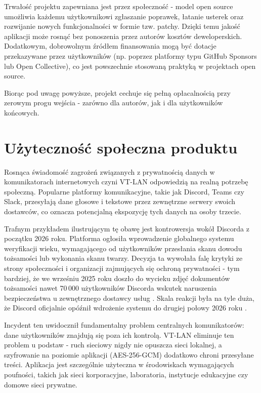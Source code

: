 Trwałość projektu zapewniana jest przez społeczność - model open source
umożliwia każdemu użytkownikowi zgłaszanie poprawek, łatanie usterek oraz
rozwijanie nowych funkcjonalności w formie tzw. patchy. Dzięki temu jakość
aplikacji może rosnąć bez ponoszenia przez autorów kosztów deweloperskich.
Dodatkowym, dobrowolnym źródłem finansowania mogą być dotacje przekazywane
przez użytkowników (np. poprzez platformy typu GitHub Sponsors lub Open
Collective), co jest powszechnie stosowaną praktyką w projektach open source.

Biorąc pod uwagę powyższe, projekt cechuje się pełną opłacalnością przy
zerowym progu wejścia - zarówno dla autorów, jak i dla użytkowników końcowych.

\section{Użyteczność społeczna produktu}
\label{sec:użytek}
Rosnąca świadomość zagrożeń związanych z prywatnością danych w komunikatorach
internetowych czyni VT-LAN odpowiedzią na realną potrzebę społeczną. Popularne
platformy komunikacyjne, takie jak Discord, Teams czy Slack, przesyłają dane
głosowe i tekstowe przez zewnętrzne serwery swoich dostawców, co oznacza
potencjalną ekspozycję tych danych na osoby trzecie.

Trafnym przykładem ilustrującym tę obawę jest kontrowersja wokół Discorda
z początku 2026 roku. Platforma ogłosiła wprowadzenie globalnego systemu
weryfikacji wieku, wymagającego od użytkowników przesłania skanu dowodu
tożsamości lub wykonania skanu twarzy. Decyzja ta wywołała falę krytyki
ze strony społeczności i organizacji zajmujących się ochroną prywatności
- tym bardziej, że we wrześniu 2025 roku doszło do wycieku zdjęć dokumentów
tożsamości nawet 70\,000 użytkowników Discorda wskutek naruszenia bezpieczeństwa
u zewnętrznego dostawcy usług \cite{DiscordEFF}. Skala reakcji była na tyle
duża, że Discord oficjalnie opóźnił wdrożenie systemu do drugiej połowy 2026
roku \cite{DiscordPostpone}.

Incydent ten uwidocznił fundamentalny problem centralnych komunikatorów:
dane użytkowników znajdują się poza ich kontrolą. VT-LAN eliminuje ten problem
u podstaw - ruch sieciowy nigdy nie opuszcza sieci lokalnej, a szyfrowanie
na poziomie aplikacji (AES-256-GCM) dodatkowo chroni przesyłane treści.
Aplikacja jest szczególnie użyteczna w środowiskach wymagających poufności,
takich jak sieci korporacyjne, laboratoria, instytucje edukacyjne czy
domowe sieci prywatne.

